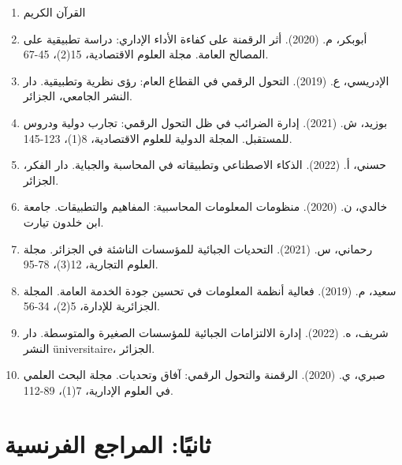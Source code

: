 \documentclass[12pt, a4paper, twoside]{report}
\begin{document}
\begin{enumerate}
    \item القرآن الكريم
    \item أبوبكر، م. (2020). أثر الرقمنة على كفاءة الأداء الإداري: دراسة تطبيقية على المصالح العامة. مجلة العلوم الاقتصادية، 15(2)، 45-67.
    \item الإدريسي، ع. (2019). التحول الرقمي في القطاع العام: رؤى نظرية وتطبيقية. دار النشر الجامعي، الجزائر.
    \item بوزيد، ش. (2021). إدارة الضرائب في ظل التحول الرقمي: تجارب دولية ودروس للمستقبل. المجلة الدولية للعلوم الاقتصادية، 8(1)، 123-145.
    \item حسني، أ. (2022). الذكاء الاصطناعي وتطبيقاته في المحاسبة والجباية. دار الفكر، الجزائر.
    \item خالدي، ن. (2020). منظومات المعلومات المحاسبية: المفاهيم والتطبيقات. جامعة ابن خلدون تيارت.
    \item رحماني، س. (2021). التحديات الجبائية للمؤسسات الناشئة في الجزائر. مجلة العلوم التجارية، 12(3)، 78-95.
    \item سعيد، م. (2019). فعالية أنظمة المعلومات في تحسين جودة الخدمة العامة. المجلة الجزائرية للإدارة، 5(2)، 34-56.
    \item شريف، ه. (2022). إدارة الالتزامات الجبائية للمؤسسات الصغيرة والمتوسطة. دار النشر üniversitaire، الجزائر.
    \item صبري، ي. (2020). الرقمنة والتحول الرقمي: آفاق وتحديات. مجلة البحث العلمي في العلوم الإدارية، 7(1)، 89-112.
\end{enumerate}

\section*{ثانيًا: المراجع الفرنسية}
\end{document}
